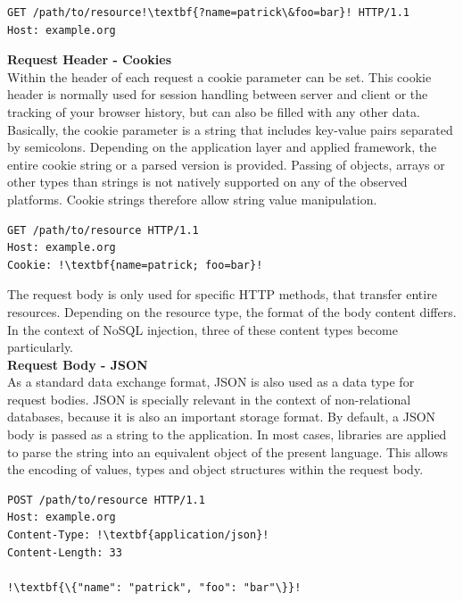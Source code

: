 \begin{lstlisting}[escapechar=!, caption={Example for GET request}, label={lst:http_request_example}]
GET /path/to/resource!\textbf{?name=patrick\&foo=bar}! HTTP/1.1
Host: example.org
\end{lstlisting}

\textbf{Request Header - Cookies}\\
Within the header of each request a cookie parameter can be set. This cookie header is normally used for session handling between server and client or the tracking of your browser history, but can also be filled with any other data. Basically, the cookie parameter is a string that includes key-value pairs separated by semicolons. Depending on the application layer and applied framework, the entire cookie string or a parsed version is provided. Passing of objects, arrays or other types than strings is not natively supported on any of the observed platforms. Cookie strings therefore allow string value manipulation. \\

\begin{lstlisting}[escapechar=!, caption={Example for GET request}, label={lst:http_request_example}]
GET /path/to/resource HTTP/1.1
Host: example.org
Cookie: !\textbf{name=patrick; foo=bar}!
\end{lstlisting}

The request body is only used for specific HTTP methods, that transfer entire resources. Depending on the resource type, the format of the body content differs. In the context of NoSQL injection, three of these content types become particularly. \\

\textbf{Request Body - JSON}\\
As a standard data exchange format, JSON is also used as a data type for request bodies. JSON is specially relevant in the context of non-relational databases, because it is also an important storage format. By default, a JSON body is passed as a string to the application. In most cases, libraries are applied to parse the string into an equivalent object of the present language. This allows the encoding of values, types and object structures within the request body. \\

\begin{lstlisting}[escapechar=!, caption={Example for HTTP request}, label={lst:http_request_example}]
POST /path/to/resource HTTP/1.1
Host: example.org
Content-Type: !\textbf{application/json}!
Content-Length: 33

!\textbf{\{"name": "patrick", "foo": "bar"\}}!
\end{lstlisting}

